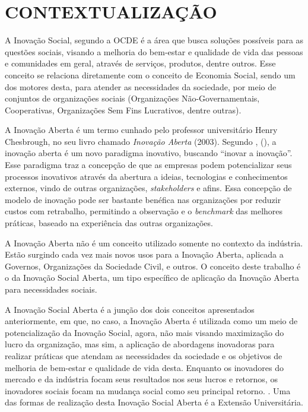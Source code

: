 \section{CONTEXTUALIZAÇÃO}
\label{contextualizacao}

A Inovação Social, segundo a \gls{OCDE} \cite{ocde2024social} é a área que busca soluções possíveis para as questões sociais, visando a melhoria do bem-estar e qualidade de vida das pessoas e comunidades em geral, através de serviços, produtos, dentre outros. Esse conceito se relaciona diretamente com o conceito de Economia Social, sendo um dos motores desta, para atender as necessidades da sociedade, por meio de conjuntos de organizações sociais (Organizações Não-Governamentais, Cooperativas, Organizações Sem Fins Lucrativos, dentre outras).

A Inovação Aberta é um termo cunhado pelo professor universitário Henry Chesbrough, no seu livro chamado \textit{Inovação Aberta} (2003). Segundo \citeauthor{chesbrough2003}, (\citeyear{chesbrough2003}), a inovação aberta é um novo paradigma inovativo, buscando “inovar a inovação”.
Esse paradigma traz a concepção de que as empresas podem potencializar seus processos inovativos através da abertura a ideias, tecnologias e conhecimentos externos, vindo de outras organizações, \textit{stakeholders} e afins. Essa concepção de modelo de inovação pode ser bastante benéfica nas organizações por reduzir custos com retrabalho, permitindo a observação e o \textit{benchmark} das melhores práticas, baseado na experiência das outras organizações.

A Inovação Aberta não é um conceito utilizado somente no contexto da indústria. Estão surgindo cada vez mais novos usos para a Inovação Aberta, aplicada a Governos, Organizações da Sociedade Civil, e outros. O conceito deste trabalho é o da Inovação Social Aberta, um tipo específico de aplicação da Inovação Aberta para necessidades sociais.

A Inovação Social Aberta é a junção dos dois conceitos apresentados anteriormente, em que, no caso, a Inovação Aberta é utilizada como um meio de potencialização da Inovação Social, agora, não mais visando maximização do lucro da organização, mas sim, a aplicação de abordagens inovadoras para realizar práticas que atendam as necessidades da sociedade e os objetivos de melhoria de bem-estar e qualidade de vida desta. Enquanto os inovadores do mercado e da indústria focam seus resultados nos seus lucros e retornos, os inovadores sociais focam na mudança social como seu principal retorno. \cite{chesbrough2014}. Uma das formas de realização desta Inovação Social Aberta é a Extensão Universitária.

